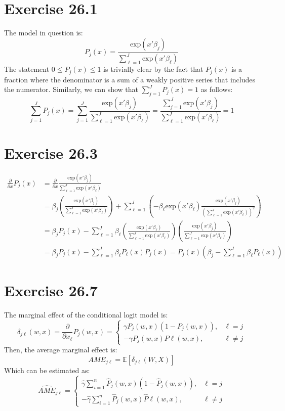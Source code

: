 \documentclass{article}
\newcommand{\sumn}{\sum_{i=1}^{n}}
\newcommand{\e}[1]{\text{exp}\left(#1\right)}
\newcommand{\E}[1]{\mathbb{E}\left[#1\right]}%
\begin{document}
\section*{Exercise 26.1}
The model in question is:
\[
	P_j(x) = \frac{\e{x'\beta_j}}{\sum_{\ell=1}^J\e{x'\beta_\ell}}
\]
The statement $0\leq P_j(x) \leq 1$ is trivially clear by the fact that $P_j(x)$ is a fraction where the denominator is a sum of a weakly positive series that includes the numerator. Similarly, we can show that ${\sum_{j=1}^J P_j(x)=1}$ as follows:
\[
	\sum_{j=1}^J P_j(x)=\sum_{j=1}^J \frac{\e{x'\beta_j}}{\sum_{\ell=1}^J\e{x'\beta_\ell}}
		= \frac{\sum_{j=1}^J \e{x'\beta_j}}{\sum_{\ell=1}^J\e{x'\beta_\ell}} = 1
\]


\section*{Exercise 26.3}
\begin{align*}
	\frac{\partial}{\partial x} P_j(x) &= \frac{\partial}{\partial x} \frac{\e{x'\beta_j}}{\sum_{\ell=1}^J\e{x'\beta_\ell}}					\\
		&= \beta_j\left(\frac{\e{x'\beta_j}}{\sum_{\ell=1}^J\e{x'\beta_\ell}}\right) 
			+ \sum_{\ell=1}^J\left(-\beta_\ell\e{x'\beta_\ell}\frac{\e{x'\beta_j}}{\left(\sum_{\ell=1}^J\e{x'\beta_\ell}\right)^2}\right)	\\
		&= \beta_jP_j(x) - \sum_{\ell=1}^J\beta_\ell\left(\frac{\e{x'\beta_\ell}}{\sum_{\ell=1}^J\e{x'\beta_\ell}}\right)
			\left(\frac{\e{x'\beta_j}}{\sum_{\ell=1}^J\e{x'\beta_\ell}}\right)																\\
		&= \beta_jP_j(x) - \sum_{\ell=1}^J\beta_\ell P_\ell(x)P_j(x) = P_j(x)\left(\beta_j-\sum_{\ell=1}^J\beta_\ell P_\ell(x)\right)
\end{align*}


\section*{Exercise 26.7}
The marginal effect of the conditional logit model is:
\[
	\delta_{j\ell}(w,x) =\frac{\partial}{\partial x_\ell}P_j(w,x) 
		= 	\begin{cases}
				\gamma P_j(w,x)\left(1-P_j(w,x)\right), & \ell=j 	\\
				-\gamma P_j(w,x)P\ell(w,x),				&\ell\neq j
			\end{cases}
\]
Then, the average marginal effect is:
\[
	AME_{j\ell} = \E{\delta_{j\ell}(W,X)}
\]
Which can be estimated as:
\[
	\widehat{AME}_{j\ell} = \begin{cases}
								\hat{\gamma}  \sumn \hat{P}_j(w,x)\left(1-\hat{P}_j(w,x)\right), 	& \ell=j 	\\
								-\hat{\gamma} \sumn \hat{P}_j(w,x)\hat{P}\ell(w,x),					&\ell\neq j
							\end{cases}
\]
\end{document}
